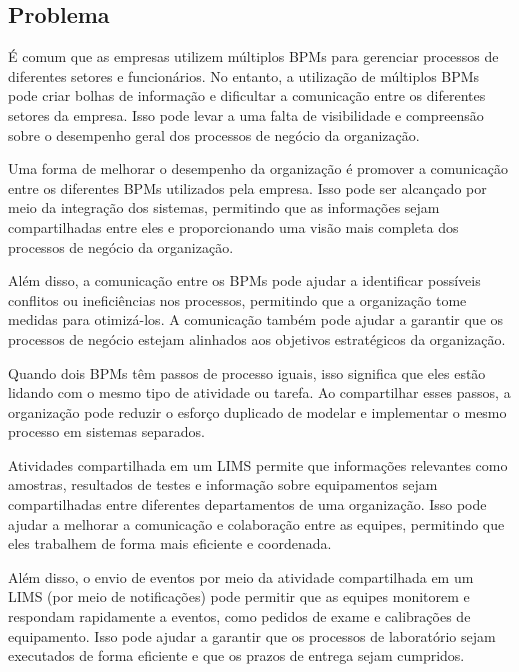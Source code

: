 \subsection{Problema}

É comum que as empresas utilizem múltiplos BPMs para gerenciar processos de diferentes setores e funcionários.
No entanto, a utilização de múltiplos BPMs pode criar bolhas de informação e dificultar a comunicação entre os diferentes setores da empresa. Isso pode levar a uma falta de visibilidade e compreensão sobre o desempenho geral dos processos de negócio da organização.

Uma forma de melhorar o desempenho da organização é promover a comunicação entre os diferentes BPMs utilizados pela empresa. Isso pode ser alcançado por meio da integração dos sistemas, permitindo que as informações sejam compartilhadas entre eles e proporcionando uma visão mais completa dos processos de negócio da organização.

Além disso, a comunicação entre os BPMs pode ajudar a identificar possíveis conflitos ou ineficiências nos processos, permitindo que a organização tome medidas para otimizá-los. A comunicação também pode ajudar a garantir que os processos de negócio estejam alinhados aos objetivos estratégicos da organização.

Quando dois BPMs têm passos de processo iguais, isso significa que eles estão lidando com o mesmo tipo de atividade ou tarefa. Ao compartilhar esses passos, a organização pode reduzir o esforço duplicado de modelar e implementar o mesmo processo em sistemas separados.

Atividades compartilhada em um LIMS permite que informações relevantes como amostras, resultados de testes e informação sobre equipamentos sejam compartilhadas entre diferentes departamentos de uma organização. Isso pode ajudar a melhorar a comunicação e colaboração entre as equipes, permitindo que eles trabalhem de forma mais eficiente e coordenada.

Além disso, o envio de eventos por meio da atividade compartilhada em um LIMS (por meio de notificações) pode permitir que as equipes monitorem e respondam rapidamente a eventos, como pedidos de exame e calibrações de equipamento. Isso pode ajudar a garantir que os processos de laboratório sejam executados de forma eficiente e que os prazos de entrega sejam cumpridos.